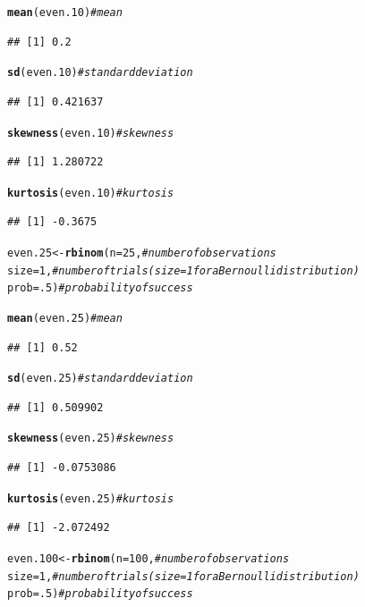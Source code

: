 \documentclass{article}\usepackage[]{graphicx}\usepackage[]{color}
\makeatletter
\newcommand{\hlnum}[1]{\textcolor[rgb]{0.686,0.059,0.569}{#1}}%
\newcommand{\hlcom}[1]{\textcolor[rgb]{0.678,0.584,0.686}{\textit{#1}}}%
\newcommand{\hlstd}[1]{\textcolor[rgb]{0.345,0.345,0.345}{#1}}%
\newcommand{\hlkwb}[1]{\textcolor[rgb]{0.69,0.353,0.396}{#1}}%
\newcommand{\hlkwc}[1]{\textcolor[rgb]{0.333,0.667,0.333}{#1}}%
\newcommand{\hlkwd}[1]{\textcolor[rgb]{0.737,0.353,0.396}{\textbf{#1}}}%
\newenvironment{kframe}{%
 \def\at@end@of@kframe{}%
 \ifinner\ifhmode%
  \def\at@end@of@kframe{\end{minipage}}%
  \begin{minipage}{\columnwidth}%
 \fi\fi%
 \def\FrameCommand##1{\hskip\@totalleftmargin \hskip-\fboxsep
 \colorbox{shadecolor}{##1}\hskip-\fboxsep
     \hskip-\linewidth \hskip-\@totalleftmargin \hskip\columnwidth}%
 \MakeFramed {\advance\hsize-\width
   \@totalleftmargin\z@ \linewidth\hsize
   \@setminipage}}%
 {\par\unskip\endMakeFramed%
 \at@end@of@kframe}
\newenvironment{knitrout}{}{} %
\makeatother
\begin{document}
\begin{enumerate}
\begin{enumerate}
\begin{knitrout}
\begin{kframe}
\begin{alltt}
\hlkwd{mean}\hlstd{(even.10)}                    \hlcom{#mean}
\end{alltt}
\begin{verbatim}
## [1] 0.2
\end{verbatim}
\begin{alltt}
\hlkwd{sd}\hlstd{(even.10)}                      \hlcom{#standard deviation}
\end{alltt}
\begin{verbatim}
## [1] 0.421637
\end{verbatim}
\begin{alltt}
\hlkwd{skewness}\hlstd{(even.10)}                \hlcom{#skewness}
\end{alltt}
\begin{verbatim}
## [1] 1.280722
\end{verbatim}
\begin{alltt}
\hlkwd{kurtosis}\hlstd{(even.10)}                \hlcom{#kurtosis}
\end{alltt}
\begin{verbatim}
## [1] -0.3675
\end{verbatim}
\begin{alltt}
\hlstd{even.25}  \hlkwb{<-} \hlkwd{rbinom}\hlstd{(}\hlkwc{n}\hlstd{=}\hlnum{25}\hlstd{,}         \hlcom{#number of observations}
              \hlkwc{size}\hlstd{=}\hlnum{1}\hlstd{,}            \hlcom{#number of trials (size=1 for a Bernoulli distribution)}
              \hlkwc{prob}\hlstd{=}\hlnum{.5}\hlstd{)}           \hlcom{#probability of success}

\hlkwd{mean}\hlstd{(even.25)}                    \hlcom{#mean}
\end{alltt}
\begin{verbatim}
## [1] 0.52
\end{verbatim}
\begin{alltt}
\hlkwd{sd}\hlstd{(even.25)}                      \hlcom{#standard deviation}
\end{alltt}
\begin{verbatim}
## [1] 0.509902
\end{verbatim}
\begin{alltt}
\hlkwd{skewness}\hlstd{(even.25)}                \hlcom{#skewness}
\end{alltt}
\begin{verbatim}
## [1] -0.0753086
\end{verbatim}
\begin{alltt}
\hlkwd{kurtosis}\hlstd{(even.25)}                \hlcom{#kurtosis}
\end{alltt}
\begin{verbatim}
## [1] -2.072492
\end{verbatim}
\begin{alltt}
\hlstd{even.100} \hlkwb{<-} \hlkwd{rbinom}\hlstd{(}\hlkwc{n}\hlstd{=}\hlnum{100}\hlstd{,}        \hlcom{#number of observations}
              \hlkwc{size}\hlstd{=}\hlnum{1}\hlstd{,}            \hlcom{#number of trials (size=1 for a Bernoulli distribution)}
              \hlkwc{prob}\hlstd{=}\hlnum{.5}\hlstd{)}           \hlcom{#probability of success}


\end{alltt}
\end{kframe}
\end{knitrout}
\end{enumerate}
\end{enumerate}
\end{document}
